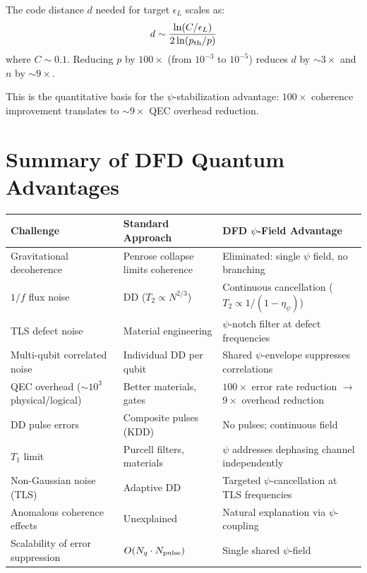 \documentclass[11pt,letterpaper]{article}
\begin{document}
The code distance $d$ needed for target $\epsilon_L$ scales as:
\begin{equation}
d \sim \frac{\ln(C/\epsilon_L)}{2\ln(p_{\rm th}/p)}
\end{equation}
where $C \sim 0.1$. Reducing $p$ by $100\times$ (from $10^{-3}$ to
$10^{-5}$) reduces $d$ by $\sim 3\times$ and $n$ by $\sim 9\times$.

This is the quantitative basis for the $\psi$-stabilization advantage:
$100\times$ coherence improvement translates to $\sim 9\times$ QEC
overhead reduction.

\section{Summary of DFD Quantum Advantages}

\begin{longtable}{p{4.5cm}p{4cm}p{4cm}}
\toprule
\textbf{Challenge} & \textbf{Standard Approach} & \textbf{DFD $\psi$-Field
Advantage} \\
\midrule
\endhead
Gravitational decoherence & Penrose collapse limits coherence &
Eliminated: single $\psi$ field, no branching \\[6pt]
$1/f$ flux noise & DD ($T_2 \propto N^{2/3}$) & Continuous cancellation
($T_2 \propto 1/(1-\eta_\psi)$) \\[6pt]
TLS defect noise & Material engineering & $\psi$-notch filter at defect
frequencies \\[6pt]
Multi-qubit correlated noise & Individual DD per qubit & Shared
$\psi$-envelope suppresses correlations \\[6pt]
QEC overhead ($\sim 10^3$ physical/logical) & Better materials,
gates & $100\times$ error rate reduction $\to$ $9\times$ overhead
reduction \\[6pt]
DD pulse errors & Composite pulses (KDD) & No pulses; continuous
field \\[6pt]
$T_1$ limit & Purcell filters, materials & $\psi$ addresses dephasing
channel independently \\[6pt]
Non-Gaussian noise (TLS) & Adaptive DD & Targeted $\psi$-cancellation
at TLS frequencies \\[6pt]
Anomalous coherence effects & Unexplained & Natural explanation via
$\psi$-coupling \\[6pt]
Scalability of error suppression & $O(N_q \cdot N_{\rm pulse})$ &
Single shared $\psi$-field \\
\bottomrule
\end{longtable}
\end{document}
